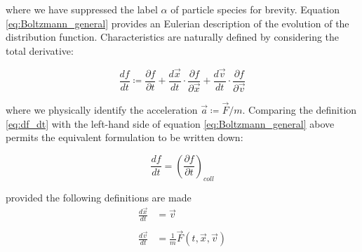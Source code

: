 \documentclass[11pt,titlepage]{report}
\begin{document}
\noindent where we have suppressed the label $\alpha$ of particle species for brevity. Equation \eqref{eq:Boltzmann_general} provides an Eulerian description of the evolution of the distribution function. Characteristics are naturally defined by considering the total derivative:

\begin{equation}\frac{df}{dt} \coloneqq \frac{\partial f}{\partial t} + \frac{d\vec{x}}{dt}\cdot\frac{\partial f}{\partial\vec{x}} + \frac{d\vec{v}}{dt}\cdot\frac{\partial f}{\partial\vec{v}}\label{eq:df_dt}\end{equation}

\noindent where we physically identify the acceleration $\vec{a} \coloneqq \vec{F}/m$. Comparing the definition \eqref{eq:df_dt} with the left-hand side of equation \eqref{eq:Boltzmann_general} above permits the equivalent formulation to be written down:


\begin{equation}
\frac{df}{dt} = \left(\frac{\partial f}{\partial t}\right)_{coll} \label{eq:Boltzmann_total_derivative}
\end{equation}

\noindent provided the following definitions are made
\begin{subequations}
\begin{align}
\frac{d\vec{x}}{dt} &= \vec{v} \label{eq:lgn_dxdt}\\
& \nonumber \\
\frac{d\vec{v}}{dt} &=  \frac{1}{m}\vec{F}(t,\vec{x},\vec{v}) \label{eq:lgn_dvdt}
\end{align}
\end{subequations}
\end{document}
